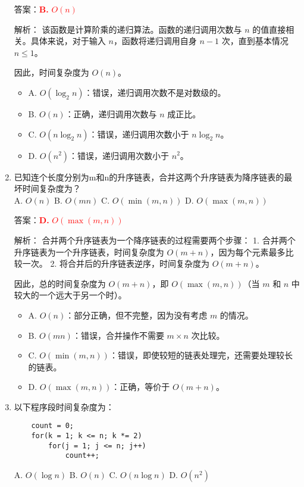 \documentclass[lang=cn,newtx,10pt,scheme=chinese]{../../../elegantbook}
\begin{document}
\begin{enumerate}
    答案：\textcolor{red}{\textbf{B.} $O(n)$}

    解析：
    该函数是计算阶乘的递归算法。函数的递归调用次数与 $n$ 的值直接相关。具体来说，对于输入 $n$，函数将递归调用自身 $n-1$ 次，直到基本情况 $n \leq 1$。
    
    因此，时间复杂度为 $O(n)$。

    \begin{itemize}
        \item A. $O(\log_2 n)$：错误，递归调用次数不是对数级的。
        \item B. $O(n)$：正确，递归调用次数与 $n$ 成正比。
        \item C. $O(n \log_2 n)$：错误，递归调用次数小于 $n \log_2 n$。
        \item D. $O(n^2)$：错误，递归调用次数小于 $n^2$。
    \end{itemize}

    \item 已知连个长度分别为m和n的升序链表，合并这两个升序链表为降序链表的最坏时间复杂度为？\\
    A. $O(n)$ \quad B. $O(mn)$ \quad C. $O(\min(m,n))$ \quad D. $O(\max(m,n))$

    答案：\textcolor{red}{\textbf{D.} $O(\max(m,n))$}

    解析：
    合并两个升序链表为一个降序链表的过程需要两个步骤：
    1. 合并两个升序链表为一个升序链表，时间复杂度为 $O(m+n)$，因为每个元素最多比较一次。
    2. 将合并后的升序链表逆序，时间复杂度为 $O(m+n)$。
    
    因此，总的时间复杂度为 $O(m+n)$，即 $O(\max(m,n))$（当 $m$ 和 $n$ 中较大的一个远大于另一个时）。

    \begin{itemize}
        \item A. $O(n)$：部分正确，但不完整，因为没有考虑 $m$ 的情况。
        \item B. $O(mn)$：错误，合并操作不需要 $m \times n$ 次比较。
        \item C. $O(\min(m,n))$：错误，即使较短的链表处理完，还需要处理较长的链表。
        \item D. $O(\max(m,n))$：正确，等价于 $O(m+n)$。
    \end{itemize}

    \item 以下程序段时间复杂度为：
    \begin{verbatim}
    count = 0;
    for(k = 1; k <= n; k *= 2)
        for(j = 1; j <= n; j++)
            count++;
    \end{verbatim}
    A. $O(\log n)$ \quad B. $O(n)$ \quad C. $O(n \log n)$ \quad D. $O(n^2)$


\end{enumerate}
\end{document}
